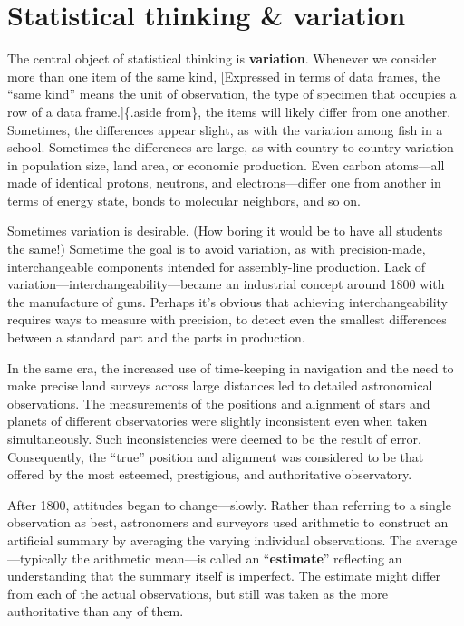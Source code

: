 \documentclass[
  letterpaper,
  DIV=11,
  numbers=noendperiod,
  oneside]{scrartcl}
\begin{document}
\newpage

\section{Statistical thinking \& variation}\label{sec-variation}

The central object of statistical thinking is \textbf{variation}.
Whenever we consider more than one item of the same kind, {[}Expressed
in terms of data frames, the ``same kind'' means the unit of
observation, the type of specimen that occupies a row of a data
frame.{]}\{.aside from\}, the items will likely differ from one another.
Sometimes, the differences appear slight, as with the variation among
fish in a school. Sometimes the differences are large, as with
country-to-country variation in population size, land area, or economic
production. Even carbon atoms---all made of identical protons, neutrons,
and electrons---differ one from another in terms of energy state, bonds
to molecular neighbors, and so on.

Sometimes variation is desirable. (How boring it would be to have all
students the same!) Sometime the goal is to avoid variation, as with
precision-made, interchangeable components intended for assembly-line
production. Lack of variation---interchangeability---became an
industrial concept around 1800 with the manufacture of guns. Perhaps
it's obvious that achieving interchangeability requires ways to measure
with precision, to detect even the smallest differences between a
standard part and the parts in production.

In the same era, the increased use of time-keeping in navigation and the
need to make precise land surveys across large distances led to detailed
astronomical observations. The measurements of the positions and
alignment of stars and planets of different observatories were slightly
inconsistent even when taken simultaneously. Such inconsistencies were
deemed to be the result of error. Consequently, the ``true'' position
and alignment was considered to be that offered by the most esteemed,
prestigious, and authoritative observatory.

After 1800, attitudes began to change---slowly. Rather than referring to
a single observation as best, astronomers and surveyors used arithmetic
to construct an artificial summary by averaging the varying individual
observations. The average---typically the arithmetic mean---is called an
``\textbf{estimate}'' reflecting an understanding that the summary
itself is imperfect. The estimate might differ from each of the actual
observations, but still was taken as the more authoritative than any of
them.
\end{document}
